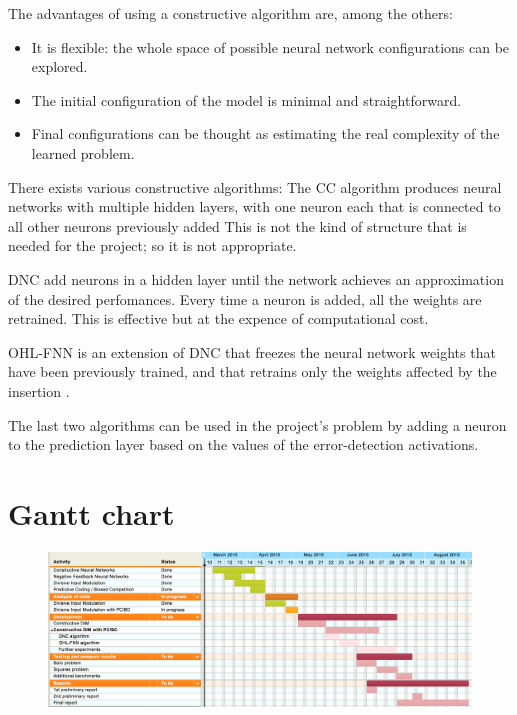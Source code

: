 \documentclass[a4paper,12pt]{article}
\begin{document}
		The advantages of using a constructive algorithm are, among the others:
		\begin{itemize}
			\item It is flexible: the whole space of possible neural network configurations can be explored.
			\item The initial configuration of the model is minimal and straightforward.
			\item Final configurations can be thought as estimating the real complexity of the learned problem.
		\end{itemize}
		
		There exists various constructive algorithms:
		The CC algorithm produces neural networks with multiple hidden layers, with one neuron each that is connected to all other neurons previously added \cite{sharma2010constructive}
		This is not the kind of structure that is needed for the project; so it is not appropriate.
		
		DNC add neurons in a hidden layer until the network achieves an approximation of the desired perfomances.
		Every time a neuron is added, all the weights are retrained. This is effective but at the expence of computational cost. \cite{sharma2010constructive}
		
		OHL-FNN is an extension of DNC that freezes the neural network weights that have been previously trained,
		and that retrains only the weights affected by the insertion \cite{kwok1997objective}.
		
		The last two algorithms can be used in the project's problem by adding a neuron to the prediction layer based on the values
		of the error-detection activations.

\section{Gantt chart}
		\begin{figure}[H]
  			\centering
			\includegraphics[width=1.1\textwidth]{gantt}
		\end{figure}
		
		


\end{document}
